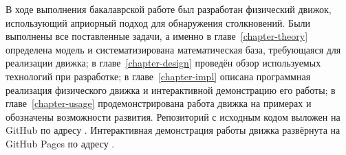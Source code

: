 
В ходе выполнения бакалаврской работе был разработан
физический движок, использующий априорный подход для обнаружения столкновений.
Были выполнены все поставленные задачи, а именно
в главе~\ref{chapter-theory} определена модель и систематизирована математическая база, требующаяся для реализации движка;
в главе~\ref{chapter-design} проведён обзор используемых технологий при разработке;
в главе~\ref{chapter-impl} описана программная реализация физического движка и интерактивной демонстрацию его работы;
в главе~\ref{chapter-usage} продемонстрирована работа движка на примерах и обозначены возможности развития.
Репозиторий с исходным кодом выложен на GitHub по адресу
\underline{}.
Интерактивная демонстрация работы движка развёрнута на GitHub Pages по адресу
\underline{}.
